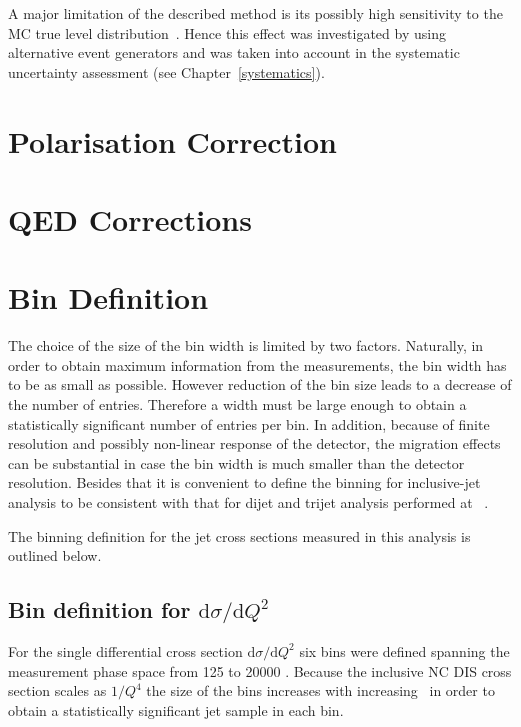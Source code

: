 A major limitation of the described method is its possibly high sensitivity to the MC true level distribution~\cite{cowan note}. Hence this effect was investigated by using alternative event generators and was taken into account in the systematic uncertainty assessment (see Chapter~\ref{systematics}).

\section{Polarisation Correction}

 
\section{QED Corrections}


\section{Bin Definition}
\label{sec:bindef}
The choice of the size of the bin width is limited by two factors. Naturally, in order to obtain maximum information from the measurements, the bin width has to be as small as possible. However reduction of the bin size leads to a decrease of the number of entries. Therefore a width must be large enough to obtain a statistically significant number of entries per bin. In addition, because of finite resolution and possibly non-linear response of the detector, the migration effects can be substantial in case the bin width is much smaller than the detector resolution. Besides that it is convenient to define the binning for inclusive-jet analysis to be consistent with that for dijet and trijet analysis performed at \zeus~\cite{joerg Makarenko}.

The binning definition for the jet cross sections measured in this analysis is outlined below.
\subsection*{Bin definition for ${\mathrm{d}\sigma}/{\mathrm{d}Q^2}$}
\label{subsec:bindefq2}
For the single differential cross section ${\mathrm{d}\sigma}/{\mathrm{d}Q^2}$ six bins were defined spanning the measurement phase space from 125 \GeV to 20000 \GeV. Because the inclusive NC DIS cross section scales as $1/Q^4$ the size of the bins increases with increasing \qsq~in order to obtain a statistically significant jet sample in each bin.
